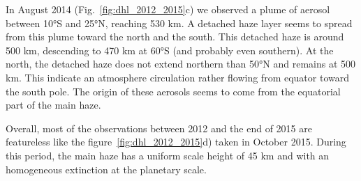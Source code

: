 In August 2014 (Fig.~\ref{fig:dhl_2012_2015}c) we observed a plume of aerosol between \ang{10}S and \ang{25}N,
reaching 530 km. A detached haze layer seems to spread from this plume toward the north and the south. This
detached haze is around 500 km, descending to 470 km at \ang{60}S (and probably even southern). At the
north, the detached haze does not extend northern than \ang{50}N and remains at 500 km. This indicate an
atmosphere circulation rather flowing from equator toward the south pole. The origin of these aerosols seems to come
from the equatorial part of the main haze.

Overall, most of the observations between 2012 and the end of 2015 are featureless like the figure~\ref{fig:dhl_2012_2015}d)
taken in October 2015. During this period, the main haze has a uniform scale height of 45 km and
with an homogeneous extinction at the planetary scale.
